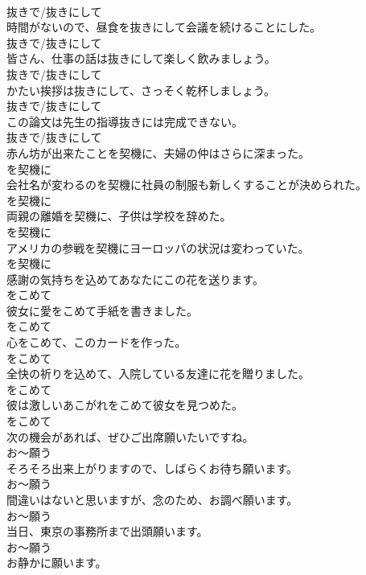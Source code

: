 \documentclass[8pt]{extreport}
\begin{document}
\begin{CJK}{UTF8}{min}
\\	抜きで/抜きにして
\\	時間がないので、昼食を抜きにして会議を続けることにした。	
\\	抜きで/抜きにして
\\	皆さん、仕事の話は抜きにして楽しく飲みましょう。	
\\	抜きで/抜きにして
\\	かたい挨拶は抜きにして、さっそく乾杯しましょう。	
\\	抜きで/抜きにして
\\	この論文は先生の指導抜きには完成できない。	
\\	抜きで/抜きにして
\\	赤ん坊が出来たことを契機に、夫婦の仲はさらに深まった。	
\\	を契機に
\\	会社名が変わるのを契機に社員の制服も新しくすることが決められた。	
\\	を契機に
\\	両親の離婚を契機に、子供は学校を辞めた。	
\\	を契機に
\\	アメリカの参戦を契機にヨーロッパの状況は変わっていた。	
\\	を契機に
\\	感謝の気持ちを込めてあなたにこの花を送ります。	
\\	をこめて
\\	彼女に愛をこめて手紙を書きました。	
\\	をこめて
\\	心をこめて、このカードを作った。	
\\	をこめて
\\	全快の祈りを込めて、入院している友達に花を贈りました。	
\\	をこめて
\\	彼は激しいあこがれをこめて彼女を見つめた。	
\\	をこめて
\\	次の機会があれば、ぜひご出席願いたいですね。	
\\	お～願う
\\	そろそろ出来上がりますので、しばらくお待ち願います。	
\\	お～願う
\\	間違いはないと思いますが、念のため、お調べ願います。	
\\	お～願う
\\	当日、東京の事務所まで出頭願います。	
\\	お～願う
\\	お静かに願います。	

\end{CJK}
\end{document}
